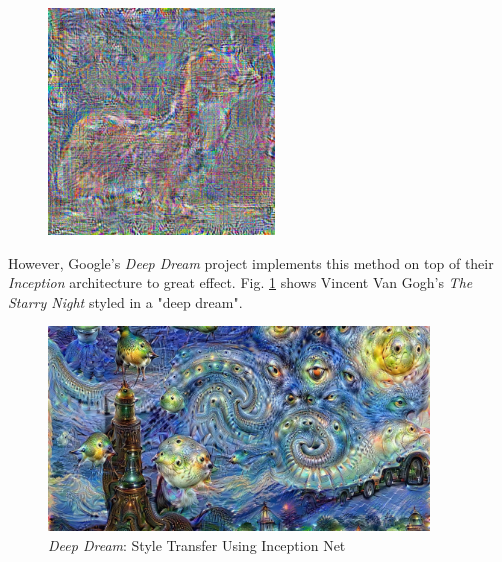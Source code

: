 \documentclass{article}
\begin{document}
\begin{figure}[htp]
\begin{minipage}{0.3\linewidth}
    \end{minipage}
    \begin{minipage}{0.3\linewidth}
    \includegraphics[width=\textwidth]{img/other-models/alex-net-x}
    \end{minipage}
\end{figure}


However, Google's \textit{Deep Dream} project implements this method on top
of their \textit{Inception} architecture to great effect. Fig.
\ref{fig:deep-dream} shows Vincent Van Gogh's \textit{The Starry Night} styled in
a "deep dream".

\begin{figure}[htp]
\centering
\caption{\textit{Deep Dream}: Style Transfer Using Inception Net}
\label{fig:deep-dream}
\includegraphics[width=0.9\textwidth]{img/deep-dream}
\end{figure}
\end{document}
